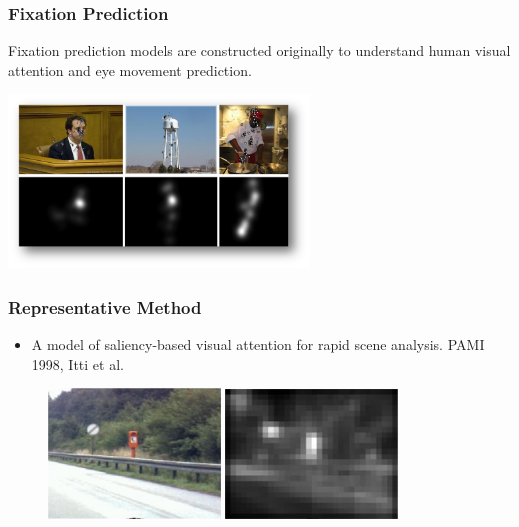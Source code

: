 \documentclass[notheorems,serif,table,compress]{beamer}  %
\begin{document}
\begin{frame}
\frametitle{Fixation Prediction}
Fixation prediction models are constructed originally to understand human visual attention and eye movement prediction.

\centering\includegraphics[width=8cm]{fixationPrediction.png}
\end{frame}

\begin{frame}
\frametitle{Representative Method}
\begin{itemize}
\item A model of saliency-based visual attention for rapid scene analysis. PAMI 1998, Itti et al.
\end{itemize}
\begin{figure}[!ht]
  \begin{minipage}[t]{0.45\textwidth}
  \includegraphics[width=1.8in]{sign}
  \end{minipage}
  \begin{minipage}[t]{0.45\textwidth}
  \includegraphics[width=1.8in]{signSaliency}
  \end{minipage}
  \end{figure} 
\end{frame}
\end{document}
